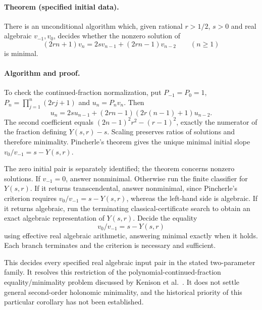 \documentclass[11pt,a4paper]{article}
\theoremstyle{definition}
\theoremstyle{remark}
\numberwithin{equation}{section}
\begin{document}
\paragraph{Theorem (specified initial data).}
There is an unconditional algorithm which, given rational $r>1/2$, $s>0$
and real algebraic $v_{-1},v_0$, decides whether the nonzero solution of
\[
 (2rn+1)v_n=2s v_{n-1}+(2rn-1)v_{n-2}\qquad(n\geq1)
\]
is minimal.

\paragraph{Algorithm and proof.}
To check the continued-fraction normalization, put $P_{-1}=P_0=1$,
$P_n=\prod_{j=1}^n(2rj+1)$ and $u_n=P_nv_n$. Then
\[
 u_n=2s u_{n-1}+(2rn-1)(2r(n-1)+1)u_{n-2}.
\]
The second coefficient equals
$(2n-1)^2r^2-(r-1)^2$, exactly the numerator of the fraction defining
$Y(s,r)-s$. Scaling preserves ratios of solutions and therefore
minimality. Pincherle's theorem gives the unique minimal initial slope
$v_0/v_{-1}=s-Y(s,r)$.

The zero initial pair is separately identified; the theorem concerns
nonzero solutions. If $v_{-1}=0$, answer nonminimal. Otherwise run the
finite classifier for $Y(s,r)$. If it returns transcendental, answer
nonminimal, since Pincherle's criterion requires
$v_0/v_{-1}=s-Y(s,r)$, whereas the left-hand side is algebraic.
If it returns algebraic, run the terminating classical-certificate search
to obtain an exact algebraic representation of $Y(s,r)$. Decide the equality
\[
 v_0/v_{-1}=s-Y(s,r)
\]
using effective real algebraic arithmetic, answering minimal exactly when
it holds. Each branch terminates and the criterion is necessary and sufficient.

This decides every specified real algebraic input pair in the stated
two-parameter family. It resolves this
restriction of the polynomial-continued-fraction equality/minimality problem
discussed by Kenison et al.~\cite{fields-Kenison}. It does
not settle general second-order holonomic minimality, and the historical
priority of this particular corollary has not been established.
\end{document}
